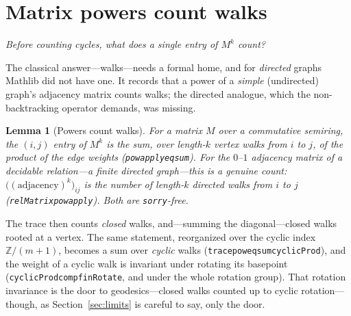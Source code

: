 \documentclass[11pt]{article}
\newtheorem{lemma}{Lemma}
\newcommand{\lean}[1]{{\def\_{\textunderscore\allowbreak}\texttt{#1}}}
\newcommand{\Z}{\mathbb{Z}}
\begin{document}
\section{Matrix powers count walks}
\label{sec:walks}

\emph{Before counting cycles, what does a single entry of $M^k$ count?}

The classical answer---walks---needs a formal home, and for \emph{directed} graphs Mathlib did not
have one. It records that a power of a \emph{simple} (undirected) graph's adjacency matrix counts
walks; the directed analogue, which the non-backtracking operator demands, was missing.

\begin{lemma}[Powers count walks]
\label{lem:walks}
For a matrix $M$ over a commutative semiring, the $(i,j)$ entry of $M^k$ is the sum, over
length-$k$ vertex walks from $i$ to $j$, of the product of the edge weights
(\lean{pow\_apply\_eq\_sum}). For the $0$--$1$ adjacency matrix of a decidable relation---a finite
directed graph---this is a genuine count: $\bigl((\text{adjacency})^k\bigr)_{ij}$ is the number of
length-$k$ directed walks from $i$ to $j$ (\lean{relMatrix\_pow\_apply}). Both are \lean{sorry}-free.
\end{lemma}

The trace then counts \emph{closed} walks, and---summing the diagonal---closed walks rooted at a
vertex. The same statement, reorganized over the cyclic index $\Z/(m{+}1)$, becomes a sum over
\emph{cyclic} walks (\lean{trace\_pow\_eq\_sum\_cyclicProd}), and the weight of a cyclic walk is
invariant under rotating its basepoint (\lean{cyclicProd\_comp\_finRotate}, and under the whole
rotation group). That rotation invariance is the door to geodesics---closed walks counted up to
cyclic rotation---though, as Section~\ref{sec:limits} is careful to say, only the door.
\end{document}
